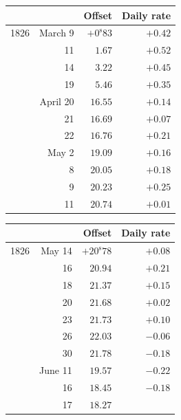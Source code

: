 \begin{center}
\begingroup\small\setlength{\tabcolsep}{5pt}
\begin{tabular}{lr|r|r}
 & & Offset & Daily rate \\
\hline
1826 & March 9 & $+0^{\mathrm s}83$ & $+0.42$ \\
 & 11 & $1.67$ & $+0.52$ \\
 & 14 & $3.22$ & $+0.45$ \\
 & 19 & $5.46$ & $+0.35$ \\
 & April 20 & $16.55$ & $+0.14$ \\
 & 21 & $16.69$ & $+0.07$ \\
 & 22 & $16.76$ & $+0.21$ \\
 & May 2 & $19.09$ & $+0.16$ \\
 & 8 & $20.05$ & $+0.18$ \\
 & 9 & $20.23$ & $+0.25$ \\
 & 11 & $20.74$ & $+0.01$ \\
\end{tabular}
\par\medskip
\begin{tabular}{lr|r|r}
 & & Offset & Daily rate \\
\hline
1826 & May 14 & $+20^{\mathrm s}78$ & $+0.08$ \\
 & 16 & $20.94$ & $+0.21$ \\
 & 18 & $21.37$ & $+0.15$ \\
 & 20 & $21.68$ & $+0.02$ \\
 & 23 & $21.73$ & $+0.10$ \\
 & 26 & $22.03$ & $-0.06$ \\
 & 30 & $21.78$ & $-0.18$ \\
 & June 11 & $19.57$ & $-0.22$ \\
 & 16 & $18.45$ & $-0.18$ \\
 & 17 & $18.27$ &  \\
\end{tabular}
\endgroup
\end{center}

